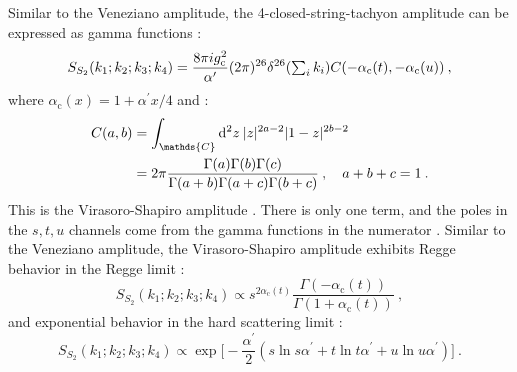 Similar to the Veneziano amplitude, the 4-closed-string-tachyon amplitude can be expressed as gamma functions :
\begin{equation}
	S_{S_{2}}(k_{1} ; k_{2} ; k_{3} ; k_{4})=\frac{8 \pi i g_{\mathrm{c}}^{2}}{\alpha^{\prime}}(2 \pi)^{26} 
	\delta^{26}({\textstyle \sum_{i} k_{i}}) C(-\alpha_{\mathrm{c}}(t),-\alpha_{\mathrm{c}}(u)) \:, \label{6.6.10}
\end{equation}
where $\alpha_{\mathrm{c}}(x)=1+\alpha^{\prime} x / 4$ and :
\begin{align}
	C(a, b) &=\int_{\mathds{C}} \dif^{2} z \: |z|^{2 a-2}|1-z|^{2 b-2} \nonumber \\
	&=2 \pi \frac{\Gamma(a) \Gamma(b) \Gamma(c)}{\Gamma(a+b) \Gamma(a+c) \Gamma(b+c)}\:, \quad a+b+c=1 \:. \label{6.6.11}
\end{align}
This is the Virasoro-Shapiro amplitude . There is only one term, and the poles in the $s, t, u$ channels come from the gamma functions in the numerator . Similar to the Veneziano amplitude, the Virasoro-Shapiro amplitude exhibits Regge behavior in the Regge limit :
\begin{equation}
	S_{S_{2}}(k_{1} ; k_{2} ; k_{3} ; k_{4}) \propto s^{2 \alpha_{\mathrm{c}}(t)} 
	\frac{\Gamma(-\alpha_{\mathrm{c}}(t))}{\Gamma(1+\alpha_{\mathrm{c}}(t))} \:, \label{6.6.12}
\end{equation}
and exponential behavior in the hard scattering limit :
\begin{equation}
	S_{S_{2}}(k_{1} ; k_{2} ; k_{3} ; k_{4}) \propto \exp 
	\biggl[-\frac{\alpha^{\prime}}{2}(s \ln s \alpha^{\prime}+t \ln t \alpha^{\prime}+u \ln u \alpha^{\prime})\biggr] \:. \label{6.6.13}
\end{equation}

